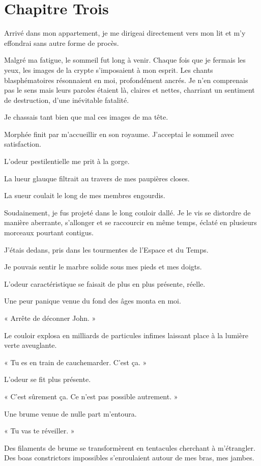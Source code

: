\chapter[Chapitre Trois]{Chapitre Trois}
Arrivé dans mon appartement, je me dirigeai directement vers mon lit et m'y effondrai sans autre forme de procès.

Malgré ma fatigue, le sommeil fut long à venir. Chaque fois que je fermais les yeux, les images de la crypte 
s'imposaient à mon esprit. Les chants blasphématoires résonnaient en moi, profondément ancrés. Je n'en comprenais pas 
le sens mais leurs paroles étaient là, claires et nettes, charriant un sentiment de destruction, d'une inévitable 
fatalité.

Je chassais tant bien que mal ces images de ma tête.

Morphée finit par m'accueillir en son royaume. J'acceptai le sommeil avec satisfaction.

L'odeur pestilentielle me prit à la gorge.

La lueur glauque filtrait au travers de mes paupières closes. 

La sueur coulait le long de mes membres engourdis.

Soudainement, je fus projeté dans le long couloir dallé. Je le vis se distordre de manière aberrante, s'allonger et se 
raccourcir en même temps, éclaté en plusieurs morceaux pourtant contigus.

J'étais dedans, pris dans les tourmentes de l'Espace et du Temps.

Je pouvais sentir le marbre solide sous mes pieds et mes doigts.

L'odeur caractéristique se faisait de plus en plus présente, réelle.

Une peur panique venue du fond des âges monta en moi.

« Arrête de déconner John. »

Le couloir explosa en milliards de particules infimes laissant place à la lumière verte aveuglante.

« Tu es en train de cauchemarder. C'est ça. »

L'odeur se fit plus présente.

« C'est sûrement ça. Ce n'est pas possible autrement. »

Une brume venue de nulle part m'entoura.

« Tu vas te réveiller. » 

Des filaments de brume se transformèrent en tentacules cherchant à m'étrangler. Des boas constrictors impossibles 
s'enroulaient autour de mes bras, mes jambes.

